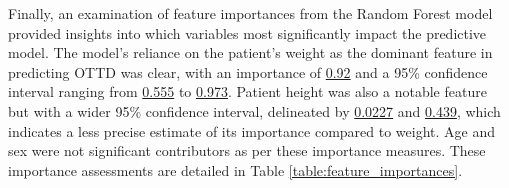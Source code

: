 \documentclass[11pt]{article}
\begin{document}
Finally, an examination of feature importances from the Random Forest model provided insights into which variables most significantly impact the predictive model. The model's reliance on the patient's weight as the dominant feature in predicting OTTD was clear, with an importance of \hyperlink{C4a}{0.92} and a 95\% confidence interval ranging from \hyperlink{C4b}{0.555} to \hyperlink{C4c}{0.973}. Patient height was also a notable feature but with a wider 95\% confidence interval, delineated by \hyperlink{C3b}{0.0227} and \hyperlink{C3c}{0.439}, which indicates a less precise estimate of its importance compared to weight. Age and sex were not significant contributors as per these importance measures. These importance assessments are detailed in Table \ref{table:feature_importances}.

\end{document}

